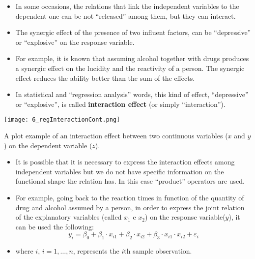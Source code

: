 \begin{frame}
   \vspace*{.25cm}
  \begin{itemize}
    \item In some occasions, the relations that link the independent variables to the dependent one can be not ``released'' among them, but they can interact.
    \vspace{0.15cm}
    \item The synergic effect of the presence of two influent factors, can be ``depressive'' or ``explosive'' on the response variable.
    \vspace{0.15cm}
    \item For example, it is known that assuming alcohol together with drugs produces a synergic effect on the lucidity and the reactivity of a person. The synergic effect reduces the ability better than the sum of the effects.
    \vspace{0.15cm}
    \item In statistical and ``regression analysis'' words, this kind of effect, ``depressive'' or ``explosive'', is called \textbf{interaction effect} (or simply ``interaction'').
  \end{itemize}
\end{frame}

\begin{frame}
  \begin{center}
    \texttt{[image: 6\_regInteractionCont.png]}
  \end{center}
  A plot example of an interaction effect between two continuous variables ($ x $ and $ y $) on the dependent variable ($ z $).
\end{frame}

\begin{frame}
  \vspace*{.25cm}
  \begin{itemize}
    \item It is possible that it is necessary to express the interaction effects among independent variables but we do not have specific information on the functional shape the relation has. In this case ``product'' operators are used. %
    \vspace{0.25cm}
    \item For example, going back to the reaction times in function of the quantity of drug and alcohol assumed by a person, in order to express the joint relation of the explanatory variables (called $ x_1 $ e $ x_2 $) on the response variable($ y $), it can be used the following:
    \vspace{-0.3cm} $$ y_i = \beta_0 + \beta_1 \cdot x_{i1} + \beta_2 \cdot x_{i2} + \beta_3 \cdot x_{i1} \cdot x_{i2} + \varepsilon_i $$ \vspace{-1cm} \item[]
      where $ i $, $ i=1, \dots, n $, represents the $i$th sample observation.
  \end{itemize}
\end{frame}


